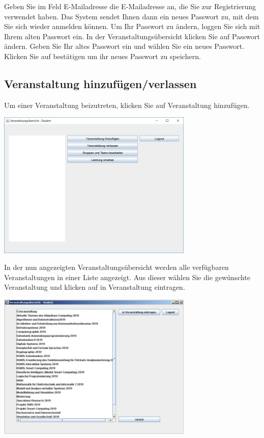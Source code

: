 \documentclass{Handbuch}
\begin{document}
Geben Sie im Feld \glqq E-Mailadresse\grqq{} die E-Mailadresse an, die Sie zur Registrierung verwendet haben. Das System sendet Ihnen dann ein neues Passwort zu, mit dem Sie sich wieder anmelden können. 
Um Ihr Passwort zu ändern, loggen Sie sich mit Ihrem alten Passwort ein. In der Veranstaltungsübersicht klicken Sie auf \frqq Passwort ändern\flqq. Geben Sie Ihr altes Passwort ein und wählen Sie ein neues Passwort. Klicken Sie auf \frqq bestätigen\flqq{} um ihr neues Passwort zu speichern.

\subsection{Veranstaltung hinzufügen/verlassen}
Um einer Veranstaltung beizutreten, klicken Sie auf \frqq Veranstaltung hinzufügen\flqq{}. 
\begin{center}
	\includegraphics[width=0.7\textwidth]{img_student1.jpg}
\end{center}
In der nun angezeigten Veranstaltungsübersicht werden alle verfügbaren Veranstaltungen in einer Liste angezeigt. Aus dieser wählen Sie die gewünschte Veranstaltung und klicken auf \frqq in Veranstaltung eintragen\flqq{}.
\begin{center}
	\includegraphics[width=0.7\textwidth]{img_student2.jpg}
\end{center}
\end{document}

